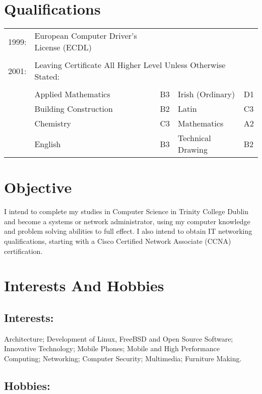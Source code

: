 \documentclass[a4paper, 11pt] {article}
\begin{document}
\section*{Qualifications}

\begin{tabular}{l l l l l}
1999: 	& European Computer Driver's License (ECDL) 	&		&	&	\\
			&                         							&		&	&	\\
2001:		& \multicolumn{3}{l}{Leaving Certificate	All Higher Level Unless Otherwise Stated:} 	\\
			&											  			   &		&	&	\\
			& Applied Mathematics								& B3 	&	Irish (Ordinary) 		& D1	\\
			& Building Construction								& B2 	&	Latin 					& C3	\\
			& Chemistry 	   									& C3	&	Mathematics 	   	& A2	\\	
			& English 												& B3 	&	Technical Drawing 	& B2	\\
\end{tabular}

\section*{Objective}

I intend to complete my studies in Computer Science in Trinity College 
Dublin and become a systems or network administrator, using my computer
knowledge and problem solving abilities to full effect. I also intend to
obtain IT networking qualifications, starting with a Cisco Certified
Network Associate (CCNA) certification.

\section*{Interests And Hobbies}

\subsection*{Interests:}

Architecture; Development of Linux, FreeBSD and Open Source
Software; Innovative Technology; Mobile Phones; Mobile and High
Performance Computing; Networking; Computer Security; Multimedia; 
Furniture Making.

\subsection*{Hobbies:}
\end{document}
